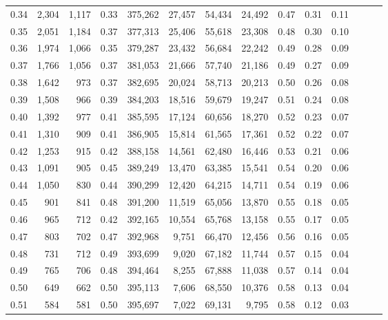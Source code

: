 \begin{tabular}{rrrrrrrrrrrrrr}
0.34 &   2,304 &  1,117 &  0.33 &  375,262 &   27,457 &  54,434 &  24,492 &  0.47 &  0.31 &      0.11 \\
0.35 &   2,051 &  1,184 &  0.37 &  377,313 &   25,406 &  55,618 &  23,308 &  0.48 &  0.30 &      0.10 \\
0.36 &   1,974 &  1,066 &  0.35 &  379,287 &   23,432 &  56,684 &  22,242 &  0.49 &  0.28 &      0.09 \\
0.37 &   1,766 &  1,056 &  0.37 &  381,053 &   21,666 &  57,740 &  21,186 &  0.49 &  0.27 &      0.09 \\
0.38 &   1,642 &    973 &  0.37 &  382,695 &   20,024 &  58,713 &  20,213 &  0.50 &  0.26 &      0.08 \\
0.39 &   1,508 &    966 &  0.39 &  384,203 &   18,516 &  59,679 &  19,247 &  0.51 &  0.24 &      0.08 \\
0.40 &   1,392 &    977 &  0.41 &  385,595 &   17,124 &  60,656 &  18,270 &  0.52 &  0.23 &      0.07 \\
0.41 &   1,310 &    909 &  0.41 &  386,905 &   15,814 &  61,565 &  17,361 &  0.52 &  0.22 &      0.07 \\
0.42 &   1,253 &    915 &  0.42 &  388,158 &   14,561 &  62,480 &  16,446 &  0.53 &  0.21 &      0.06 \\
0.43 &   1,091 &    905 &  0.45 &  389,249 &   13,470 &  63,385 &  15,541 &  0.54 &  0.20 &      0.06 \\
0.44 &   1,050 &    830 &  0.44 &  390,299 &   12,420 &  64,215 &  14,711 &  0.54 &  0.19 &      0.06 \\
0.45 &     901 &    841 &  0.48 &  391,200 &   11,519 &  65,056 &  13,870 &  0.55 &  0.18 &      0.05 \\
0.46 &     965 &    712 &  0.42 &  392,165 &   10,554 &  65,768 &  13,158 &  0.55 &  0.17 &      0.05 \\
0.47 &     803 &    702 &  0.47 &  392,968 &    9,751 &  66,470 &  12,456 &  0.56 &  0.16 &      0.05 \\
0.48 &     731 &    712 &  0.49 &  393,699 &    9,020 &  67,182 &  11,744 &  0.57 &  0.15 &      0.04 \\
0.49 &     765 &    706 &  0.48 &  394,464 &    8,255 &  67,888 &  11,038 &  0.57 &  0.14 &      0.04 \\
0.50 &     649 &    662 &  0.50 &  395,113 &    7,606 &  68,550 &  10,376 &  0.58 &  0.13 &      0.04 \\
0.51 &     584 &    581 &  0.50 &  395,697 &    7,022 &  69,131 &   9,795 &  0.58 &  0.12 &      0.03 \\

\end{tabular}
